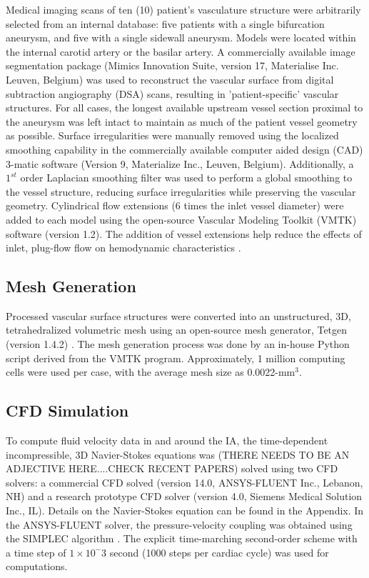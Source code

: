 Medical imaging scans of ten (10) patient's vasculature structure were arbitrarily selected from an internal database: five patients with a single bifurcation aneurysm, and five with a single sidewall aneurysm. Models were located within the internal carotid artery or the basilar artery. A commercially available image segmentation package (Mimics Innovation Suite, version 17, Materialise Inc. Leuven, Belgium) was used to reconstruct the vascular surface from digital subtraction angiography (DSA) scans, resulting in 'patient-specific' vascular structures. For all cases, the longest available upstream vessel section proximal to the aneurysm was left intact to maintain as much of the patient vessel geometry as possible. Surface irregularities were manually removed using the localized smoothing capability in the commercially available computer aided design (CAD) 3-matic software (Version 9, Materialize Inc., Leuven, Belgium). Additionally, a $1^{st}$ order Laplacian smoothing filter was used to perform a global smoothing to the vessel structure, reducing surface irregularities while preserving the vascular geometry. Cylindrical flow extensions (6 times the inlet vessel diameter) were added to each model using the open-source Vascular Modeling Toolkit (VMTK) software (version 1.2). The addition of vessel extensions help reduce the effects of inlet, plug-flow flow on hemodynamic characteristics \cite{poethke2009cerebral}.

\subsection{Mesh Generation}\label{CHAPTER3_SECTION1_SUBSECTION2}
Processed vascular surface structures were converted into an unstructured, 3D, tetrahedralized volumetric mesh using an open-source mesh generator, Tetgen (version 1.4.2) \cite{si20113d}. The mesh generation process was done by an in-house Python script derived from the VMTK program. Approximately, 1 million computing cells were used per case, with the average mesh size as 0.0022-mm$^{3}$.

\subsection{CFD Simulation}\label{CHAPTER3_SECTION1_SUBSECTION3}
To compute fluid velocity data in and around the IA, the time-dependent incompressible, 3D Navier-Stokes equations was  (THERE NEEDS TO BE AN ADJECTIVE HERE....CHECK RECENT PAPERS) solved using two CFD solvers: a commercial CFD solved (version 14.0, ANSYS-FLUENT Inc., Lebanon, NH) and a research prototype CFD solver (version 4.0, Siemens Medical Solution Inc., IL). Details on the Navier-Stokes equation can be found in the Appendix.  In the ANSYS-FLUENT solver, the pressure-velocity coupling was obtained using the SIMPLEC algorithm \cite{versteeg2007introduction}. The explicit time-marching second-order scheme with a time step of $1\times 10^-3$ second (1000 steps per cardiac cycle) was used for computations.

